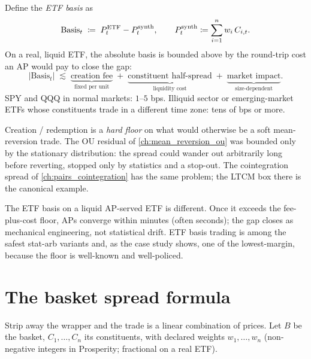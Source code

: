 \begin{keyfactbox}
Define the \emph{ETF basis} as
\begin{equation}
  \text{Basis}_t \;\coloneqq\; P^{\text{ETF}}_t - P^{\text{synth}}_t,
  \qquad P^{\text{synth}}_t \coloneqq \sum_{i=1}^n w_i\,C_{i,t}.
  \label{eq:etf_basis}
\end{equation}
On a real, liquid ETF, the absolute basis is bounded above by
the round-trip cost an AP would pay to close the gap:
\begin{equation}
  |\text{Basis}_t|
  \;\lesssim\;
  \underbrace{\text{creation fee}}_{\text{fixed per unit}}
  \;+\;
  \underbrace{\text{constituent half-spread}}_{\text{liquidity cost}}
  \;+\;
  \underbrace{\text{market impact}}_{\text{size-dependent}}.
  \label{eq:basis_bound}
\end{equation}
SPY and QQQ in normal markets: $1$--$5$ bps. Illiquid sector or
emerging-market ETFs whose constituents trade in a different time
zone: tens of bps or more.
\end{keyfactbox}

\begin{intuitionbox}
Creation / redemption is a \emph{hard floor} on what would
otherwise be a soft mean-reversion trade. The OU residual of
\cref{ch:mean_reversion_ou} was bounded only by the stationary
distribution: the spread could wander out arbitrarily long before
reverting, stopped only by statistics and a stop-out. The
cointegration spread of \cref{ch:pairs_cointegration} has the same
problem; the LTCM box there is the canonical example.

The ETF basis on a liquid AP-served ETF is different. Once it
exceeds the fee-plus-cost floor, APs converge within minutes
(often seconds); the gap closes as mechanical engineering, not
statistical drift. ETF basis trading is among the safest
stat-arb variants and, as the case study shows, one of the
lowest-margin, because the floor is well-known and well-policed.
\end{intuitionbox}

\section{The basket spread formula}
\label{sec:ch11_spread_formula}

Strip away the wrapper and the trade is a linear combination of
prices. Let $B$ be the basket, $C_1, \ldots, C_n$ its constituents,
with declared weights $w_1, \ldots, w_n$ (non-negative integers in
Prosperity; fractional on a real ETF).

